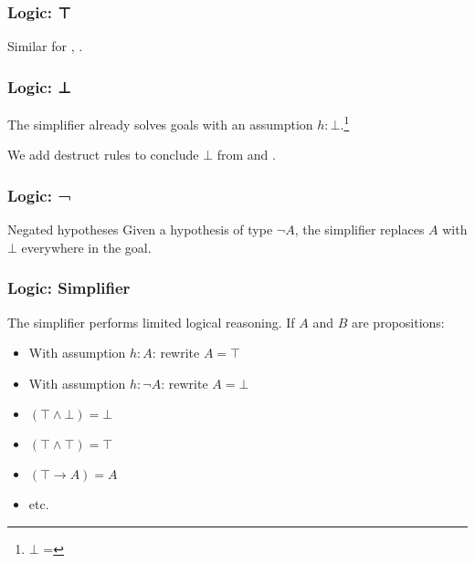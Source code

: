\documentclass[xetex]{beamer}
\newcommand{\orange}[1]{\textcolor{orange}{#1}}
\newenvironment{rapppic}{\begin{tikzpicture}[outer sep=auto, level distance=2em]}{\end{tikzpicture}}
\newenvironment{rapp}{%
  \begin{tcolorbox}
  \begin{center}
  \begin{rapppic}
}{
  \end{rapppic}
  \end{center}
  \end{tcolorbox}%
}
\begin{document}
\begin{frame}
  \frametitle{Logic: ⊤}


  \pause

  Similar for , .
\end{frame}

\begin{frame}
  \frametitle{Logic: ⊥}

  The simplifier already solves goals with an assumption $h : ⊥$.\footnote{$⊥$ = }

  \pause

  We add destruct rules to conclude $⊥$ from  and .
\end{frame}

\begin{frame}
  \frametitle{Logic: ¬}


  \pause

  \begin{block}{Negated hypotheses}
    Given a hypothesis of type $¬ A$, the simplifier replaces $A$ with $⊥$ everywhere in the goal.
  \end{block}
\end{frame}

\begin{frame}
  \frametitle{Logic: Simplifier}

  The simplifier performs limited logical reasoning.
  If $A$ and $B$ are propositions:

  \pause

  \begin{itemize}[<+->]
    \item With assumption $h : A$: rewrite $A = ⊤$
    \item With assumption $h : ¬ A$: rewrite $A = ⊥$
    \item $(⊤ ∧ ⊥) = ⊥$
    \item $(⊤ ∧ ⊤) = ⊤$
    \item $(⊤ → A) = A$
    \item etc.
  \end{itemize}
\end{frame}
\end{document}
